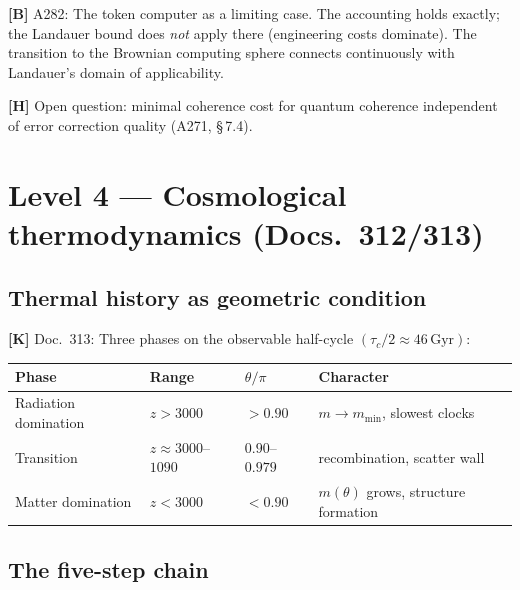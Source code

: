 \textbf{[B]} A282: The token computer as a limiting case. The accounting
holds exactly; the Landauer bound does \emph{not} apply there
(engineering costs dominate). The transition to the Brownian computing
sphere connects continuously with Landauer's domain of applicability.

\textbf{[H]} Open question: minimal coherence cost for quantum coherence
independent of error correction quality (A271, §\,7.4).

\section{Level 4 --- Cosmological thermodynamics (Docs.~312/313)}

\subsection{Thermal history as geometric condition}

\textbf{[K]} Doc.~313: Three phases on the observable half-cycle
$(\tau_c/2 \approx 46\,\text{Gyr})$:

\begin{center}
\small
\begin{tabular}{llll}
\toprule
Phase & Range & $\theta/\pi$ & Character \\
\midrule
Radiation domination & $z > 3000$ & $> 0{.}90$ &
  $m \to m_\text{min}$, slowest clocks \\
Transition & $z \approx 3000$--$1090$ & $0{.}90$--$0{.}979$ &
  recombination, scatter wall \\
Matter domination & $z < 3000$ & $< 0{.}90$ &
  $m(\theta)$ grows, structure formation \\
\bottomrule
\end{tabular}
\end{center}

\subsection{The five-step chain}

